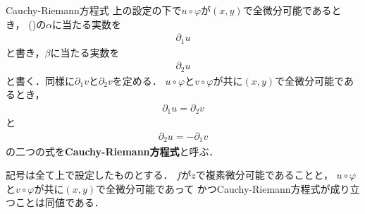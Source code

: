 	\begin{itembox}[l]{Cauchy-Riemann方程式}
		上の設定の下で$u \circ \varphi$が$(x,y)$で全微分可能であるとき，
		()の$\alpha$に当たる実数を
		\begin{align}
			\partial_1 u
		\end{align}
		と書き，$\beta$に当たる実数を
		\begin{align}
			\partial_2 u
		\end{align}
		と書く．同様に$\partial_1 v$と$\partial_2 v$を定める．
		$u \circ \varphi$と$v \circ \varphi$が共に$(x,y)$で全微分可能であるとき，
		\begin{align}
			\partial_1 u = \partial_2 v
		\end{align}
		と
		\begin{align}
			\partial_2 u = -\partial_1 v
		\end{align}
		の二つの式を{\bf Cauchy-Riemann方程式}と呼ぶ．
	\end{itembox}
	
	\begin{screen}
		\begin{thm}
			記号は全て上で設定したものとする．
			$f$が$z$で複素微分可能であることと，
			$u \circ \varphi$と$v \circ \varphi$が共に$(x,y)$で全微分可能であって
			かつCauchy-Riemann方程式が成り立つことは同値である．
		\end{thm}
	\end{screen}
	
